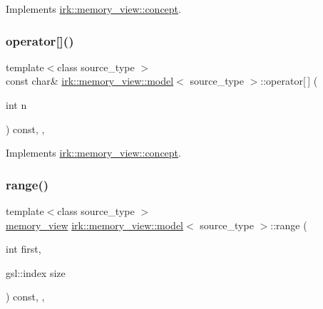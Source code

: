 Implements \mbox{\hyperlink{structirk_1_1memory__view_1_1concept_a9e124ac4016556f7cf7fd864dcc43a7c}{irk\+::memory\+\_\+view\+::concept}}.

\mbox{\label{classirk_1_1memory__view_1_1model_aa1e6d7c44b66f54ee9c94abeba0449c2}} 
\subsubsection{\texorpdfstring{operator[]()}{operator[]()}}
{\footnotesize\ttfamily template$<$class source\+\_\+type $>$ \\
const char\& \mbox{\hyperlink{classirk_1_1memory__view_1_1model}{irk\+::memory\+\_\+view\+::model}}$<$ source\+\_\+type $>$\+::operator\mbox{[}$\,$\mbox{]} (\begin{DoxyParamCaption}\item[{int}]{n }\end{DoxyParamCaption}) const\hspace{0.3cm}{\ttfamily [inline]}, {\ttfamily [override]}, {\ttfamily [virtual]}}



Implements \mbox{\hyperlink{structirk_1_1memory__view_1_1concept_a423a9cc01cfa22943f6667e7e9359c19}{irk\+::memory\+\_\+view\+::concept}}.

\mbox{\label{classirk_1_1memory__view_1_1model_ab1332728617a8e4a8f719c6fe380e100}} 
\subsubsection{\texorpdfstring{range()}{range()}}
{\footnotesize\ttfamily template$<$class source\+\_\+type $>$ \\
\mbox{\hyperlink{classirk_1_1memory__view}{memory\+\_\+view}} \mbox{\hyperlink{classirk_1_1memory__view_1_1model}{irk\+::memory\+\_\+view\+::model}}$<$ source\+\_\+type $>$\+::range (\begin{DoxyParamCaption}\item[{int}]{first,  }\item[{gsl\+::index}]{size }\end{DoxyParamCaption}) const\hspace{0.3cm}{\ttfamily [inline]}, {\ttfamily [override]}, {\ttfamily [virtual]}}



